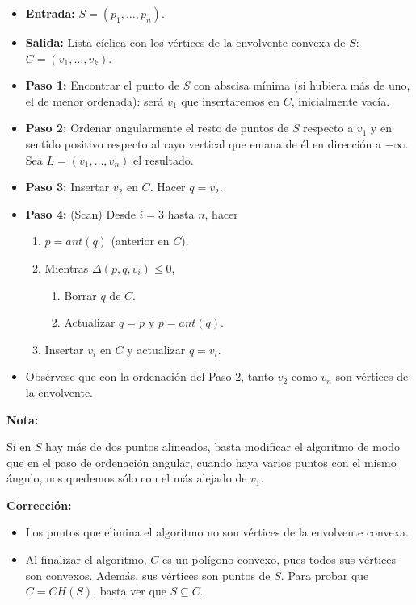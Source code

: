 \documentclass[twoside]{report}
\begin{document}
\begin{itemize}
  \item\textbf{Entrada:} $S=(p_1,\dots,p_n)$.
  \item\textbf{Salida:} Lista cíclica con los vértices de la envolvente
convexa de $S$: $C=(v_1,\dots,v_k)$.
  \item\textbf{Paso 1:} Encontrar el punto de $S$ con abscisa mínima (si
hubiera más de uno, el de menor ordenada): será $v_1$ que
insertaremos en $C$, inicialmente vacía.
  \item\textbf{Paso 2:} Ordenar angularmente el resto de puntos de $S$
res\-pec\-to a $v_1$ y en sentido positivo respecto al rayo
vertical que emana de él en dirección a $-\infty$. Sea
$L=(v_1,\dots,v_n)$ el resultado.
  \item\textbf{Paso 3:} Insertar $v_2$ en $C$. Hacer $q=v_2$.
  \item\textbf{Paso 4:} (Scan) Desde $i=3$ hasta $n$, hacer
\begin{enumerate}
  \item $p=ant(q)$ (anterior en $C$).
  \item Mientras $\Delta(p,q,v_i) \leq 0$,
\begin{enumerate}
  \item Borrar $q$ de $C$.
  \item Actualizar $q=p$ y $p=ant(q)$.
\end{enumerate}
  \item Insertar $v_i$ en $C$ y actualizar $q=v_i$.
\end{enumerate}
\end{itemize}

\begin{itemize}
  \item Obsérvese que con la ordenación del Paso 2, tanto $v_2$ como
$v_n$ son vértices de la envolvente.
\end{itemize}
\vspace{0.2cm}

{\bf Nota:}

Si en $S$ hay más de dos puntos alineados, basta
modificar el algoritmo de modo que en el paso de ordenación
angular, cuando haya varios puntos con el mismo ángulo, nos
quedemos sólo con el más alejado de $v_1$.
\vspace{1cm}

{\bf Corrección:}

\begin{itemize}
  \item Los puntos que elimina el algoritmo no son vértices de la
envolvente convexa.
  \item Al finalizar el algoritmo, $C$ es un polígono convexo, pues
todos sus vértices son convexos. Además, sus vértices son puntos
de $S$. Para probar que $C=CH(S)$, basta ver que $S \subseteq C$.
\end{itemize}
\end{document}
